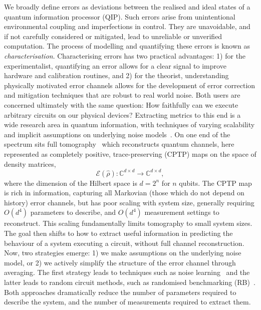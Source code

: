 We broadly define errors as deviations between the realised and ideal states of a quantum information processor (QIP). Such errors arise from unintentional environmental coupling and imperfections in control.
They are unavoidable, and if not carefully considered or mitigated, lead to unreliable or unverified computation. 
The process of modelling and quantifying these errors is known as \emph{characterisation}.
Characterising errors has two practical advantages: 1) for the experimentalist, quantifying an error allows for a clear signal to improve hardware and calibration routines, and 2) for the theorist, understanding physically motivated error channels allows for the development of error correction and mitigation techniques that are robust to real world noise. Both users are concerned ultimately with the same question: 
How faithfully can we execute arbitrary circuits on our physical devices?
Extracting metrics to this end is a wide research area in quantum information, with techniques of varying scalability and implicit assumptions on underlying noise models~\cite{eisert_quantum_2020}. On one end of the spectrum sits full
tomography~\cite{chuang_prescription_1997, nielsen_gate_2021, poyatos_complete_1997, childs_realization_2001} which reconstructs quantum channels, here represented as completely positive, trace-preserving (CPTP) maps on the space of density matrices,
\begin{equation}
\mathcal{E}(\hat\rho): \mathbb{C}^{d\times d} \to \mathbb{C}^{d\times d},
\end{equation}
where the dimension of the Hilbert space is $d=2^n$ for $n$ qubits. 
The CPTP map is rich in information, capturing all Markovian (those which do not depend on history) error channels, but has poor scaling with system size, generally requiring $O(d^4)$ parameters to describe, and $O(d^4)$ measurement settings to reconstruct. This scaling fundamentally limits tomography to small system sizes. 
The goal then shifts to how to extract useful information in predicting the behaviour of a system executing a circuit, without full channel reconstruction. Now, two strategies emerge: 
1) we make assumptions on the underlying noise model, or 
2) we actively simplify the structure of the error channel through averaging. The first strategy leads to techniques such as 
noise learning~\cite{flammia_efficient_2020,harper_efficient_2020} and the latter leads to random circuit methods, such as randomised benchmarking (RB)~\cite{magesan_scalable_2011, magesan_characterizing_2012, erhard_characterizing_2019}. Both approaches dramatically reduce the number of parameters required to describe the system, and the number of measurements required to extract them. \\

